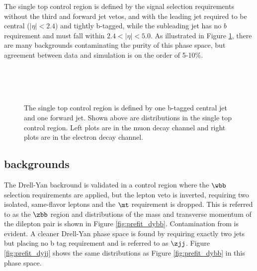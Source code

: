 The single top control region is defined by the signal selection requirements
 without the third and forward jet vetos, and
 with the leading jet required to be central
 ($|\eta|<2.4$) and tightly b-tagged,
 while the subleading jet has no $b$ requirement and must fall within
 $2.4<|\eta|<5.0$.
As illustrated in Figure \ref{fig:prefit_stt}, there are many 
 backgrounds contaminating the purity of this phase space,
 but agreement between data and simulation is on the order of 5-10\%.
\begin{figure}
      \center
     \\
     \\
     \\
      \caption{The single top control region is defined by one b-tagged central jet and one forward jet.
      Shown above are distributions in the single top control region.
       Left plots are in the muon decay channel and right
        plots are in the electron decay channel.
      }
      \label{fig:prefit_stt}
\end{figure}


\subsection{\zll backgrounds}

The Drell-Yan backround is validated in a control region where the $\wbb$
 selection requirements are applied, but the lepton veto 
 is inverted, requiring two isolated, same-flavor leptons 
 and the $\mt$ requirement is dropped.
This is referred to as the $\zbb$ region and distributions
 of the mass and transverse momentum of the dilepton pair is
 shown in Figure \ref{fig:prefit_dybb}.
Contamination from \ttbar is evident. 
A cleaner Drell-Yan phase space is found by requiring exactly two jets
 but placing no b tag requirement and is referred to as $\zjj$.
Figure \ref{fig:prefit_dyjj} shows the same distributions as
 Figure \ref{fig:prefit_dybb} in this phase space.

